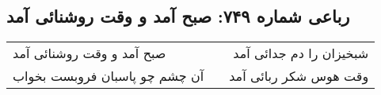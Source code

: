 \begin{center}
\section*{رباعی شماره ۷۴۹: صبح آمد و وقت روشنائی آمد}
\label{sec:0749}
\begin{longtable}{l p{0.5cm} r}
صبح آمد و وقت روشنائی آمد
&&
شبخیزان را دم جدائی آمد
\\
آن چشم چو پاسبان فروبست بخواب
&&
وقت هوس شکر ربائی آمد
\\
\end{longtable}
\end{center}
